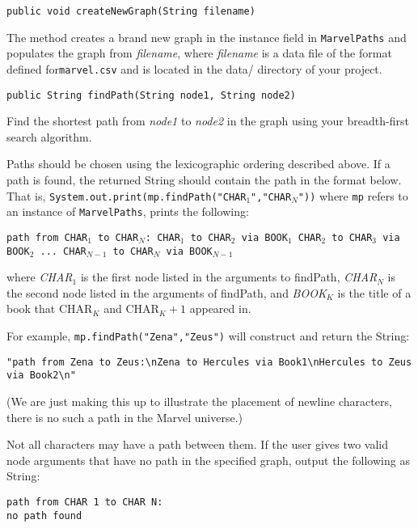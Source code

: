 \documentclass[11pt]{article}
\newcommand{\n}{\newcommand%
}
\begin{document}
\noindent \texttt{public void createNewGraph(String filename)}

\noindent The method creates a brand new graph in the instance field in \texttt{MarvelPaths} and populates the graph from \textit{filename}, where \textit{filename} is a data file of the format defined for\texttt{marvel.csv} and is located in the data/ directory of your project.

\newpage

\noindent \texttt{public String findPath(String node1, String node2)}

\noindent Find the shortest path from \textit{node1} to \textit{node2} in the graph using your breadth-first search algorithm.

\noindent Paths should be chosen using the lexicographic ordering described above. If a path is found, the returned String should contain the path in the format below. That is, 
\newline
\texttt{System.out.print(mp.findPath("CHAR$_1$","CHAR$_N$"))} where \texttt{mp} refers to an instance of \texttt{MarvelPaths}, prints the following:

\noindent \texttt{path from CHAR$_1$ to CHAR$_N$:
\newline
CHAR$_1$ to CHAR$_2$ via BOOK$_1$
\newline
CHAR$_2$ to CHAR$_3$ via BOOK$_2$
\newline
...
\newline
CHAR$_{N-1}$ to CHAR$_N$ via BOOK$_{N-1}$}

\noindent where \textit{CHAR$_1$} is the first node listed in the arguments to findPath, \textit{CHAR$_N$} is the second node listed in the arguments of findPath, and \textit{BOOK$_K$} is the title of a book that CHAR$_K$ and CHAR$_K+1$ appeared in.

\noindent For example, \texttt{mp.findPath("Zena","Zeus")} will construct and return the String: \begin{verbatim}"path from Zena to Zeus:\nZena to Hercules via Book1\nHercules to Zeus via Book2\n"\end{verbatim} (We are just making this up to illustrate the placement of newline characters, there is no such a path in the Marvel universe.)

Not all characters may have a path between them. If the user gives two valid node arguments that have no path in the specified graph, output the following as String:
\begin{verbatim}
path from CHAR 1 to CHAR N:
no path found
\end{verbatim}
\end{document}
